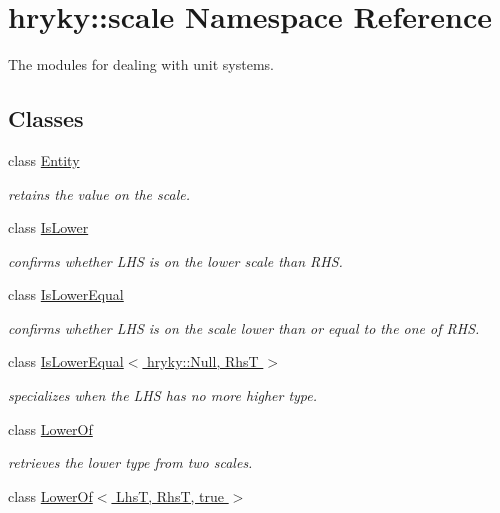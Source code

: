 \hypertarget{namespacehryky_1_1scale}{\section{hryky\-:\-:scale Namespace Reference}
\label{namespacehryky_1_1scale}
}


The modules for dealing with unit systems.  


\subsection*{Classes}
\begin{DoxyCompactItemize}
\item 
class \hyperlink{classhryky_1_1scale_1_1_entity}{Entity}
\begin{DoxyCompactList}\small\item\em retains the value on the scale. \end{DoxyCompactList}\item 
class \hyperlink{classhryky_1_1scale_1_1_is_lower}{Is\-Lower}
\begin{DoxyCompactList}\small\item\em confirms whether L\-H\-S is on the lower scale than R\-H\-S. \end{DoxyCompactList}\item 
class \hyperlink{classhryky_1_1scale_1_1_is_lower_equal}{Is\-Lower\-Equal}
\begin{DoxyCompactList}\small\item\em confirms whether L\-H\-S is on the scale lower than or equal to the one of R\-H\-S. \end{DoxyCompactList}\item 
class \hyperlink{classhryky_1_1scale_1_1_is_lower_equal_3_01hryky_1_1_null_00_01_rhs_t_01_4}{Is\-Lower\-Equal$<$ hryky\-::\-Null, Rhs\-T $>$}
\begin{DoxyCompactList}\small\item\em specializes when the L\-H\-S has no more higher type. \end{DoxyCompactList}\item 
class \hyperlink{classhryky_1_1scale_1_1_lower_of}{Lower\-Of}
\begin{DoxyCompactList}\small\item\em retrieves the lower type from two scales. \end{DoxyCompactList}\item 
class \hyperlink{classhryky_1_1scale_1_1_lower_of_3_01_lhs_t_00_01_rhs_t_00_01true_01_4}{Lower\-Of$<$ Lhs\-T, Rhs\-T, true $>$}

\end{DoxyCompactItemize}
